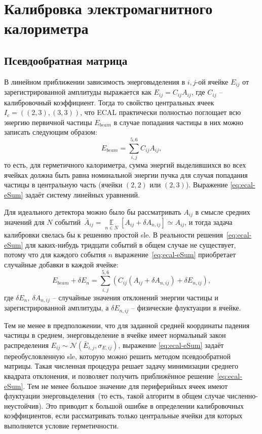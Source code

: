 \section{Калибровка электромагнитного калориметра}

\subsection{Псевдообратная матрица}

В линейном приближении зависимость энерговыделения в $i,j$-ой ячейке $E_{ij}$
от зарегистрированной амплитуды выражается как $E_{ij} = C_{ij} A_{ij}$, где
$C_{ij}$ -- калибровочный коэффициент. Тогда то свойство центральных
ячеек $I_c = ((2,3), (3,3))$, что ECAL практически полностью поглощает
всю энергию первичной частицы $E_{beam}$ в случае попадания частицы в них
можно записать следующим образом:
\begin{equation}
    E_{beam} = \sum\limits_{i,j}^{5,6} C_{ij} A_{ij},
    \label{eq:ecal-eSum}
\end{equation}
то есть, для герметичного калориметра, сумма энергий выделившихся во всех
ячейках должна быть равна номинальной энергии пучка для случая попадания
частицы в центральную часть (ячейки $(2,2)$ или $(2,3)$). Выражение
\eqref{eq:ecal-eSum} задаёт систему линейных уравнений.

Для идеального детектора можно было бы рассматривать $A_{ij}$ в смысле
средних значений для $N$ событий~$\bar{A}_{ij}=\mathop{\mathbb{E}}\limits_{n \in N}[A_{ij} + \delta A_{n,ij}] \simeq A_{ij}$, и тогда задача калибровки свелась
бы к решению простой \acrshort{sle}. В реальности решения~\eqref{eq:ecal-eSum} для
каких-нибудь тридцати событий в общем
случае не существует, потому что для каждого события $n$
выражение~\eqref{eq:ecal-eSum} приобретает случайные добавки в каждой ячейке:
\begin{equation}
    E_{beam} + \delta E_n = \sum\limits_{i,j}^{5,6} \left( C_{ij} (A_{ij} + \delta A_{n,ij}) + \delta E_{n,ij} \right),
    \label{eq:ecal-eSum-deviating}
\end{equation}
где $\delta E_n,~\delta A_{n,ij}$ -- случайные значения отклонений энергии
частицы и зарегистрированной амплитуды, а $\delta E_{n,ij}$ -- физические флуктуации
в ячейке.

Тем не менее в предположении, что для заданной средней координаты
падения частицы в среднем, энерговыделение в ячейке имеет нормальный
закон распределения $E_{ij} \sim \mathcal{N}(\bar{E}_{i,j},\sigma_{E,ij})$,
выражение \eqref{eq:ecal-eSum} задаёт переобусловленную \acrshort{sle},
которую можно решить методом псевдообратной матрицы. Такая численная процедура
решает задачу минимизации среднего квадрата отклонения, и позволяет получить
приближённое решение~\eqref{eq:ecal-eSum}. Тем не менее большое значение
для периферийных ячеек имеют флуктуации энерговыделения~(то есть, такой алгоритм
в общем случае численно-неустойчив).
Это приводит к большой ошибке в определении калибровочных
коэффициентов, если рассматривать только центральные ячейки для которых
выполняется условие герметичности.

